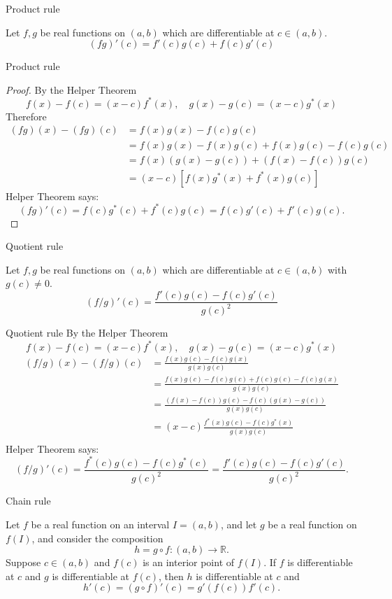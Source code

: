 \documentclass{beamer}
\begin{document}
\begin{frame}{Product rule}
\begin{thm}
Let $f,g$ be real functions on $(a,b)$ which are differentiable at $c\in (a,b)$.\\
$$(fg)'(c) = f'(c)g(c) + f(c)g'(c)$$
\end{thm}
\end{frame}
\begin{frame}{Product rule}
\begin{proof}
\pause
By the Helper Theorem
$$f(x)-f(c) = (x-c)f^*(x),\quad g(x)-g(c) = (x-c)g^*(x)$$
\pause
Therefore
\begin{align*}
(fg)(x)-(fg)(c)
  & = f(x)g(x) - f(c)g(c)\\
  & = f(x)g(x) - f(x)g(c) + f(x)g(c)-f(c)g(c)\\
  & = f(x)(g(x) - g(c)) + (f(x)-f(c))g(c)\\
  & = (x-c)[f(x)g^*(x) + f^*(x)g(c)]
\end{align*}
\pause
Helper Theorem says:
$$(fg)'(c) = f(c)g^*(c) + f^*(c)g(c) = f(c)g'(c) + f'(c)g(c).$$
\end{proof}
\end{frame}

\begin{frame}{Quotient rule}
\begin{thm}
Let $f,g$ be real functions on $(a,b)$ which are differentiable at $c\in (a,b)$ with $g(c)\neq 0$.\\
$$(f/g)'(c) = \frac{f'(c)g(c) - f(c)g'(c)}{g(c)^2}$$
\end{thm}
\end{frame}
\begin{frame}{Quotient rule}\mbox{}
{\tiny
By the Helper Theorem
$$f(x)-f(c) = (x-c)f^*(x),\quad g(x)-g(c) = (x-c)g^*(x)$$
\pause
\begin{align*}
(f/g)(x) - (f/g)(c)
  & = \frac{f(x)g(c)-f(c)g(x)}{g(x)g(c)}\\
  & = \frac{f(x)g(c)-f(c)g(c)+f(c)g(c)-f(c)g(x)}{g(x)g(c)}\\
  & = \frac{(f(x)-f(c))g(c)-f(c)(g(x)-g(c))}{g(x)g(c)}\\
  & = (x-c)\frac{f^*(x)g(c)-f(c)g^*(x)}{g(x)g(c)}\\
\end{align*}
\pause
Helper Theorem says:
$$(f/g)'(c) = \frac{f^*(c)g(c)-f(c)g^*(c)}{g(c)^2} = \frac{f'(c)g(c)-f(c)g'(c)}{g(c)^2}.$$
}
\end{frame}

\begin{frame}{Chain rule}
\begin{thm}
Let $f$ be a real function on an interval $I = (a,b)$, and let $g$ be a real function on $f(I)$, and consider the composition
$$h = g\circ f: (a,b)\rightarrow\mathbb{R}.$$
Suppose $c\in (a,b)$ and $f(c)$ is an interior point of $f(I)$.
If $f$ is differentiable at $c$ and $g$ is differentiable at $f(c)$, then $h$ is differentiable at $c$ and
$$h'(c) = (g\circ f)'(c) = g'(f(c))f'(c).$$
\end{thm}
\end{frame}
\end{document}
